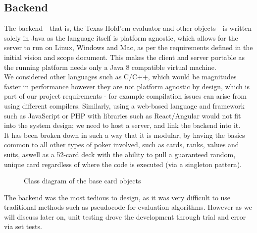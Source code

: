 \documentclass[11pt]{article}
\begin{document}
\newpage
\subsection{Backend}

The backend - that is, the Texas Hold'em evaluator and other objects - is written solely in Java as the language itself is platform agnostic, which allows for the server to run on Linux, Windows and Mac, as per the requirements defined in the initial vision and scope document. This makes the client and server portable as the running platform needs only a Java 8 compatible virtual machine.  \\

We considered other languages such as C/C++, which would be magnitudes faster in performance however they are not platform agnostic by design, which is part of our project requirements - for example compilation issues can arise from using different compilers. Similarly, using a web-based language and framework such as JavaScript or PHP with libraries such as React/Angular would not fit into the system design; we need to host a server, and link the backend into it. \\


It has been broken down in such a way that it is modular, by having the basics common to all other types of poker involved, such as cards, ranks, values and suits, aswell as a 52-card deck with the ability to pull a guaranteed random, unique card regardless of where the code is executed (via a singleton pattern). \\

	\begin{figure}[h]
%
\caption{Class diagram of the base card objects}
	\end{figure} 


The backend was the most tedious to design, as it was very difficult to use traditional methods such as pseudocode for evaluation algorithms. However as we will discuss later on, unit testing drove the development through trial and error via set tests. 
\end{document}
